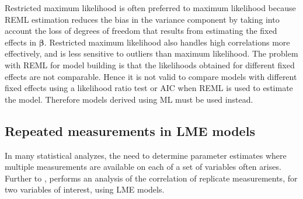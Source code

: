 \documentclass[12pt, a4paper]{report}
\theoremstyle{plain}
\theoremstyle{definition}
\theoremstyle{remark}
\begin{document}
	Restricted maximum likelihood is often preferred to maximum likelihood because REML estimation reduces the bias in the variance component by taking into account the loss of degrees of freedom that results
	from estimating the fixed effects in $\boldsymbol{\beta}$. Restricted maximum likelihood also handles high correlations more effectively, and is less sensitive to outliers than maximum likelihood.  The problem with REML for model building is that the likelihoods obtained for different fixed effects are not comparable. Hence it is not valid to compare models with different fixed effects using a likelihood ratio test or AIC when REML is used to
	estimate the model. Therefore models derived using ML must be used instead.
	
	
%	
%	
%	
%	
	
	
	
	

	\subsection{Repeated measurements in LME models}
	
	In many statistical analyzes, the need to determine parameter estimates where multiple measurements are available on each of a set of variables often arises. Further to \citet{lam}, \citet{hamlett} performs an analysis of the correlation of replicate measurements, for two variables of interest, using LME models.
	
\end{document}
